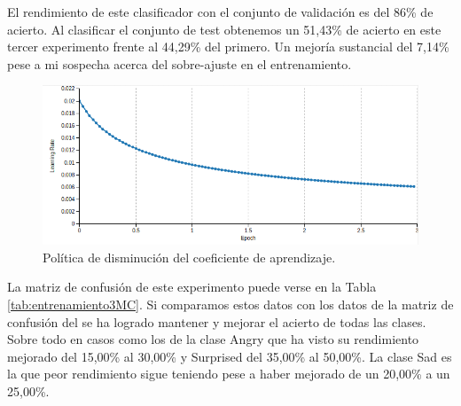 \documentclass[a4paper,11pt]{book}
\begin{document}
El rendimiento de este clasificador con el conjunto de validación es del 86\% de acierto. Al clasificar el conjunto de test obtenemos un 51,43\% de acierto en este tercer experimento frente al 44,29\% del primero. Un mejoría sustancial del 7,14\% pese a mi sospecha acerca del sobre-ajuste en el entrenamiento.

\begin{figure}[h]
	\centering
	\includegraphics[width=0.9\linewidth]{imagenes/entrenamiento3results1}
	\caption[Resultados del entrenamiento 3]{Política de disminución del coeficiente de aprendizaje.}
	\label{fig:entrenamiento3results1}
\end{figure}

La matriz de confusión de este experimento puede verse en la Tabla \ref{tab:entrenamiento3MC}. Si comparamos estos datos con los datos de la matriz de confusión del se ha logrado mantener y mejorar el acierto de todas las clases. Sobre todo en casos como los de la clase Angry que ha visto su rendimiento mejorado del 15,00\% al 30,00\% y Surprised del 35,00\% al 50,00\%. La clase Sad es la que peor rendimiento sigue teniendo pese a haber mejorado de un 20,00\% a un 25,00\%.
\end{document}
